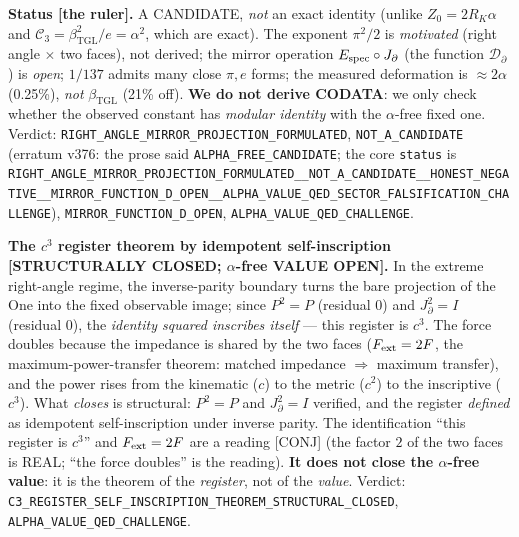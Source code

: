\documentclass[11pt]{article}
\newcommand{\bTGL}{\beta_{\mathrm{TGL}}}\newcommand{\Msun}{M_{\odot}}\newcommand{\TGL}{\mathrm{TGL}}
\theoremstyle{definition}\newtheorem{deriv}{Derivation}
\begin{document}
\textbf{Status \textsf{[the ruler]}.} A CANDIDATE, \emph{not} an exact identity (unlike $Z_0=2R_K\alpha$ and $\mathcal C_3=\bTGL^2/e=\alpha^2$, which are exact). The exponent $\pi^2/2$ is \emph{motivated} (right angle $\times$ two faces), not derived; the mirror operation $E_{\rm spec}\circ J_\partial$ (the function $\mathcal D_\partial$) is \emph{open}; $1/137$ admits many close $\pi,e$ forms; the measured deformation is $\approx 2\alpha$ (0.25\%), \emph{not} $\bTGL$ (21\% off). \textbf{We do not derive CODATA}: we only check whether the observed constant has \emph{modular identity} with the $\alpha$-free fixed one. Verdict: \texttt{RIGHT\_ANGLE\_MIRROR\_PROJECTION\_FORMULATED}, \texttt{NOT\_A\_CANDIDATE} (erratum v376: the prose said \texttt{ALPHA\_FREE\_CANDIDATE}; the core \texttt{status} is \texttt{RIGHT\_ANGLE\_MIRROR\_PROJECTION\_FORMULATED\_\_NOT\_A\_CANDIDATE\_\_HONEST\_NEGATIVE\_\_MIRROR\_FUNCTION\_D\_OPEN\_\_ALPHA\_VALUE\_QED\_SECTOR\_FALSIFICATION\_CHALLENGE}), \texttt{MIRROR\_FUNCTION\_D\_OPEN}, \texttt{ALPHA\_VALUE\_QED\_CHALLENGE}.

\textbf{The $c^3$ register theorem by idempotent self-inscription \textsf{[STRUCTURALLY CLOSED; $\alpha$-free VALUE OPEN]}.} In the extreme right-angle regime, the inverse-parity boundary turns the bare projection of the One into the fixed observable image; since $P^2=P$ (residual $0$) and $J_\partial^2=I$ (residual $0$), the \emph{identity squared inscribes itself} --- this register is $c^3$. The force doubles because the impedance is shared by the two faces ($F_{\rm ext}=2F$, the maximum-power-transfer theorem: matched impedance $\Rightarrow$ maximum transfer), and the power rises from the kinematic ($c$) to the metric ($c^2$) to the inscriptive ($c^3$). What \emph{closes} is structural: $P^2=P$ and $J_\partial^2=I$ verified, and the register \emph{defined} as idempotent self-inscription under inverse parity. The identification ``this register is $c^3$'' and $F_{\rm ext}=2F$ are a reading \textsf{[CONJ]} (the factor $2$ of the two faces is REAL; ``the force doubles'' is the reading). \textbf{It does not close the $\alpha$-free value}: it is the theorem of the \emph{register}, not of the \emph{value}. Verdict: \texttt{C3\_REGISTER\_SELF\_INSCRIPTION\_THEOREM\_STRUCTURAL\_CLOSED}, \texttt{ALPHA\_VALUE\_QED\_CHALLENGE}.
\end{document}
